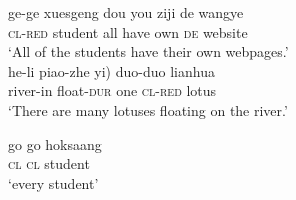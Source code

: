 \documentclass[output=paper]{langscibook}
\begin{document}
\ea \label{schv-nem:ex:23}
  \label{schv-nem:ex:23a}
  \label{schv-nem:ex:23b}
\z
\ex \label{schv-nem:ex:24}
\ea \label{schv-nem:ex:24a}
\gll ge-ge xuesgeng dou you ziji de wangye\\  
\textsc{cl}-\textsc{red} student all have own \textsc{de} website\\
\glt `All of the students have their own webpages.'\\\hfill \citep[Mandarin Chinese;][p. 118, ex. (234a)]{zhang-13}
\ex \label{schv-nem:ex:24b}
\gll he-li piao-zhe \minsp{(} yi) duo-duo lianhua \\
river-in float-\textsc{dur} {} one \textsc{cl}-\textsc{red} lotus\\
\glt `There are many lotuses floating on the river.'\\ \hfill \citep[Mandarin Chinese;][p. 118, ex. (230a)]{zhang-13}
\z


\ex \label{schv-nem:ex:25}
\gll go go hoksaang \\
\textsc{cl} \textsc{cl} student\\
\glt `every student' \hfill \citep[Cantonese;][p. 16]{wong-98}
\z

\end{document}
